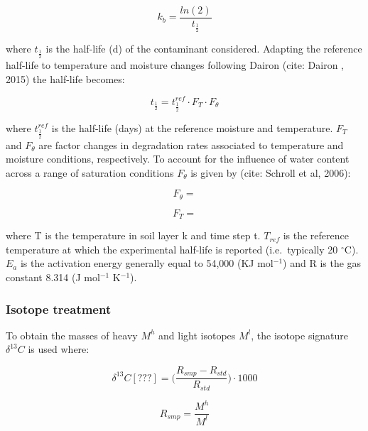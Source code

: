 \documentclass[]{article}
\begin{document}
\begin{equation}
k_b = \frac{ln(2)}{t_\frac{1}{2}} 
\label{eq:k_b}
\end{equation}

where \(t_\frac{1}{2}\) is the half-life (d) of the contaminant
considered. Adapting the reference half-life to temperature and moisture
changes following Dairon (cite: Dairon , 2015) the half-life becomes:

\begin{equation}
t_\frac{1}{2}=t_\frac{1}{2}^{ref}\cdot F_T \cdot F_\theta
\label{eq:DT50} 
\end{equation}

where \(t_\frac{1}{2}^{ref}\) is the half-life (days) at the reference
moisture and temperature. \(F_T\) and \(F_\theta\) are factor changes in
degradation rates associated to temperature and moisture conditions,
respectively. To account for the influence of water content across a
range of saturation conditions \(F_\theta\) is given by (cite: Schroll
et al, 2006):

\begin{equation} 
F_\theta = 
\end{equation}

\begin{equation} 
F_T =
\end{equation}

where T is the temperature in soil layer k and time step t. \(T_{ref}\)
is the reference temperature at which the experimental half-life is
reported (i.e.~typically 20 \(^{\circ}\)C). \(E_a\) is the activation
energy generally equal to 54,000 (KJ mol\(^{-1}\)) and R is the gas
constant 8.314 (J mol\(^{-1}\) K\(^{-1}\)).

\subsubsection{Isotope treatment}\label{isotope-treatment}

To obtain the masses of heavy \(M^h\) and light isotopes \(M^l\), the
isotope signature \(\delta ^{13}C\) is used where:

\begin{equation} 
\delta ^{13}C [???] = \Big(\frac{R_{smp} - R_{std}}{R_{std}}\Big)\cdot 1000
\end{equation}

\begin{equation} 
R_{smp} = \frac{M^h}{M^l} 
\end{equation}
\end{document}
